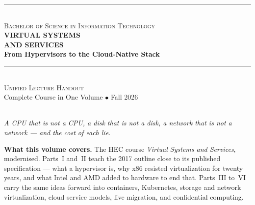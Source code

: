 \thispagestyle{empty}

\begin{center}
\vspace*{1.0cm}

{\color{secondary}\rule{0.85\textwidth}{2pt}}\\[6pt]
{\large\textsc{\color{secondary}Bachelor of Science in Information Technology}}\\[18pt]

{\Huge\bfseries\color{primary}VIRTUAL SYSTEMS}\\[4pt]
{\Huge\bfseries\color{primary}AND SERVICES}\\[10pt]
{\LARGE\bfseries\color{primary}From Hypervisors to the Cloud-Native Stack}\\[16pt]

{\color{secondary}\rule{0.85\textwidth}{2pt}}\\[16pt]

{\Large\textsc{Unified Lecture Handout}}\\[6pt]
{\large\color{gray!70!black}Complete Course in One Volume $\bullet$ Fall 2026}\\[24pt]

\\[10pt]
{\small\itshape\color{gray!70!black}A CPU that is not a CPU, a disk that is not a
disk, a network that is not a network --- and the cost of each lie.}

\vspace{1.0cm}

\begin{tcolorbox}[enhanced, width=0.86\textwidth, colback=lightbg,
  colframe=primary, boxrule=0pt, leftrule=4pt, arc=2pt, top=6pt, bottom=6pt]
\small
\textbf{\color{primary}What this volume covers.} The HEC course \emph{Virtual
Systems and Services}, modernised. Parts~I and~II teach the 2017 outline close
to its published specification --- what a hypervisor is, why x86 resisted
virtualization for twenty years, and what Intel and AMD added to hardware to
end that. Parts~III to~VI carry the same ideas forward into containers,
Kubernetes, storage and network virtualization, cloud service models, live
migration, and confidential computing.


\end{tcolorbox}
\end{center}
